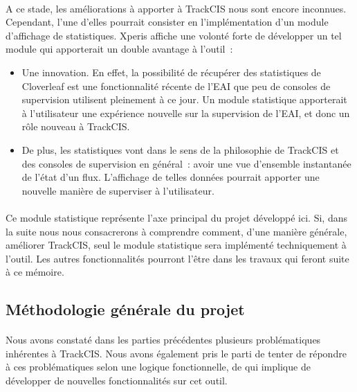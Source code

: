 			\paragraph{}%
			A ce stade, les améliorations à apporter à TrackCIS nous sont encore
			inconnues. Cependant, l'une d'elles pourrait consister en l'implémentation
			d'un module d'affichage de statistiques. Xperis affiche une volonté forte de
			développer un tel module qui apporterait un double avantage à l'outil~:
			\begin{itemize}
			  \item Une innovation. En effet, la possibilité de récupérer des
			  statistiques de Cloverleaf est une fonctionnalité récente de l'EAI que peu
			  de consoles de supervision utilisent pleinement à ce jour. Un module
			  statistique apporterait à l'utilisateur une expérience nouvelle sur la
			  supervision de l'EAI, et donc un rôle nouveau à TrackCIS.
			  \item De plus, les statistiques vont dans le sens de la philosophie de
			  TrackCIS et des consoles de supervision en général~: avoir une vue
			  d'ensemble instantanée de l'état d'un flux. L'affichage de telles données
			  pourrait apporter une nouvelle manière de superviser à l'utilisateur.
			\end{itemize}
			
			\paragraph{}
			Ce module statistique représente l'axe principal du projet développé ici. Si,
			dans la suite nous nous consacrerons à comprendre comment, d'une manière
			générale, améliorer TrackCIS, seul le module statistique sera implémenté
			techniquement à l'outil. Les autres fonctionnalités pourront l'être dans les
			travaux qui feront suite à ce mémoire.
			
		\subsection{Méthodologie générale du projet}
			\paragraph{}%
			Nous avons constaté dans les parties précédentes plusieurs problématiques
			inhérentes à TrackCIS. Nous avons également pris le parti de tenter de
			répondre à ces problématiques selon une logique fonctionnelle, de qui
			implique de développer de nouvelles fonctionnalités sur cet outil.
			
